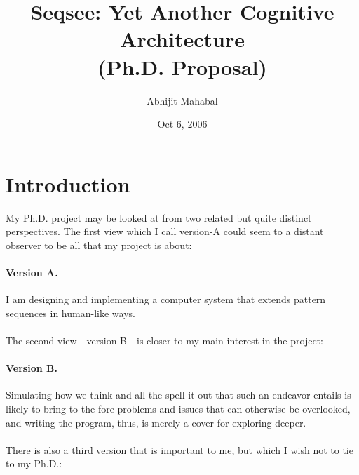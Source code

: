 \documentclass[letterpaper]{article}
\begin{document}
\title{Seqsee: Yet Another Cognitive Architecture\\{(Ph.D. Proposal)}}
\author{Abhijit Mahabal}
\date{Oct 6, 2006}
\maketitle

\renewcommand{\baselinestretch}{1.5}\small

\section*{Introduction}
\label{sec:intro}

\newcommand{\V}[1]{version-#1\xspace}
\newcommand{\hof}{Hofstadter\xspace}
\newcommand{\dan}{Dan Dennett\xspace}
\newcommand{\andy}{Andy Clark\xspace}
\newcommand{\seq}{Seqsee\xspace}
\newcommand{\tofillout}[1]{[Need to fill gap: #1\index{Gaps!#1}]}


My Ph.D. project may be looked at from two related but quite distinct perspectives.  The first view which I call \V{A} could seem to a distant observer to be all that my project is about:

\paragraph{Version A.} I am designing and implementing a computer system that extends pattern sequences in human-like ways.

\paragraph{} The second view---\V{B}---is closer to my main interest in the project:

\paragraph{Version B.} Simulating how we think and all the spell-it-out that such an endeavor entails is likely to bring to the fore problems and issues that can otherwise be overlooked, and writing the program, thus, is merely a cover for  exploring deeper.

\paragraph{} There is also a third version that is important to me, but which I wish not to tie to my Ph.D.:
\end{document}
